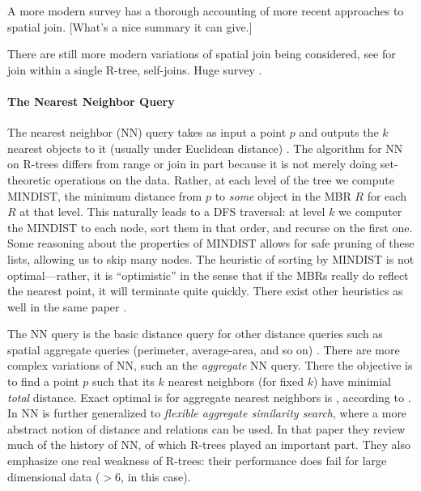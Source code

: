 A more modern survey \cite{jacoxsamet07} has a thorough accounting of more recent approaches to spatial join.
[What's a nice summary it can give.]

There are still more modern variations of spatial join being considered, see \cite{vassilakopouloscorralkaranikolas11} for join within a single R-tree, self-joins.
Huge survey \cite{jacoxsamet07}.

\paragraph{The Nearest Neighbor Query}
The nearest neighbor (NN) query takes as input a point $p$ and outputs the $k$ nearest objects to it (usually under Euclidean distance) \cite{roussopouloskelleyvincent95}.
The algorithm for NN on R-trees differs from range or join in part because it is not merely doing set-theoretic operations on the data. 
Rather, at each level of the tree we compute MINDIST, the minimum distance from $p$ to \emph{some} object in the MBR $R$ for each $R$ at that level.
This naturally leads to a DFS traversal: at level $k$ we computer the MINDIST to each node, sort them in that order, and recurse on the first one.
Some reasoning about the properties of MINDIST allows for safe pruning of these lists, allowing us to skip many nodes.
The heuristic of sorting by MINDIST is not optimal---rather, it is ``optimistic'' in the sense that if the MBRs really do reflect the nearest point, it will terminate quite quickly.
There exist other heuristics as well in the same paper \cite{roussopouloskelleyvincent95}.

The NN query is the basic distance query for other distance queries such as spatial aggregate queries (perimeter, average-area, and so on) \cite{corralalmendros-jimenez07}.
There are more complex variations of NN, such an the \emph{aggregate} NN query.
There the objective is to find a point $p$ such that its $k$ nearest neighbors (for fixed $k$) have minimial \emph{total} distance.
Exact optimal is for aggregate nearest neighbors is \cite{papadiastaomouratidishui05}, according to \cite{liliyiyaowang11}.
In \cite{liliyiyaowang11} NN is further generalized to \emph{flexible aggregate similarity search}, where a more abstract notion of distance and relations can be used.
In that paper they review much of the history of NN, of which R-trees played an important part.
They also emphasize one real weakness of R-trees: their performance does fail for large dimensional data ($>6$, in this case).

